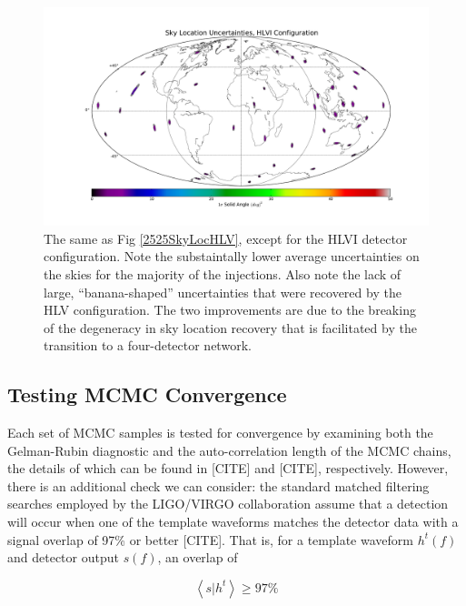 \documentclass[11pt,a4paper]{emulateapj}
\newcommand{\carl}[1]{{\color{red}  #1}}
\begin{document}
\begin{figure}[ht!]
  \centering
 \includegraphics[angle=0,scale=0.4, trim=5cm 2cm 3cm 0cm]{2p5_2p5_HLVI.pdf}
 \caption{The same as Fig \ref{2525SkyLocHLV}, except for the HLVI detector configuration.  Note the substaintally lower average uncertainties on the skies for the majority of the injections.  Also note the lack of large, ``banana-shaped'' uncertainties that were recovered by the HLV configuration.  The two improvements are due to the breaking of the degeneracy in sky location recovery that is facilitated by the transition to a four-detector network.} 
 \label{2525SkyLocHLVI}
\end{figure}
  

\subsection{Testing MCMC Convergence}

Each set of MCMC samples is tested for convergence by examining both the Gelman-Rubin diagnostic and the auto-correlation length of the MCMC chains, the details of which can be found in \carl{[CITE]} and \carl{[CITE]}, respectively.  However, there is an additional check we can consider: the standard matched filtering searches employed by the LIGO/VIRGO collaboration assume that a detection will occur when one of the template waveforms matches the detector data with a signal overlap of 97\% or better \carl{[CITE]}.  That is, for a template waveform $h^{t}(f)$ and detector output $s(f)$, an overlap of

\begin{equation}
\left< s | h^{t}\right> \geq 97\%
\nonumber
\end{equation}
\end{document}
